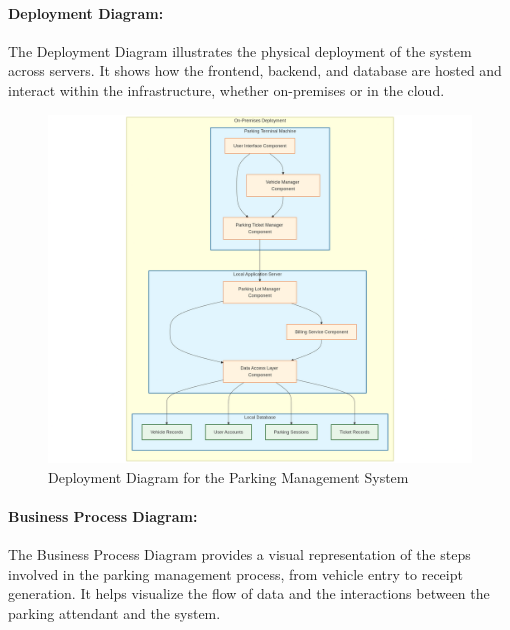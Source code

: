 \paragraph{Deployment Diagram:}
The Deployment Diagram illustrates the physical deployment of the system across servers. It shows how the frontend, backend, and database are hosted and interact within the infrastructure, whether on-premises or in the cloud.

\begin{figure}[ht]
    \centering
    \includegraphics[width=0.8\linewidth]{methods/images/Deploy.png}
    \caption{Deployment Diagram for the Parking Management System}
\end{figure}

\paragraph{Business Process Diagram:}
The Business Process Diagram provides a visual representation of the steps involved in the parking management process, from vehicle entry to receipt generation. It helps visualize the flow of data and the interactions between the parking attendant and the system.

